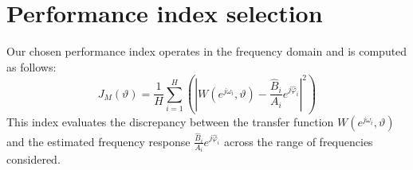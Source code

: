 \section{Performance index selection}

Our chosen performance index operates in the frequency domain and is computed as follows:
\[J_M(\vartheta)=\dfrac{1}{H}\sum_{i=1}^{H}\left(\left\lvert W(e^{j\omega_i},\vartheta)-\dfrac{\hat{B}_i}{A_i}e^{j\hat{\varphi}_i}\right\rvert^2 \right)\]
This index evaluates the discrepancy between the transfer function $W(e^{j\omega_i},\vartheta)$ and the estimated frequency response $\frac{\hat{B}_i}{A_i}e^{j\hat{\varphi}_i}$ across the range of frequencies considered.